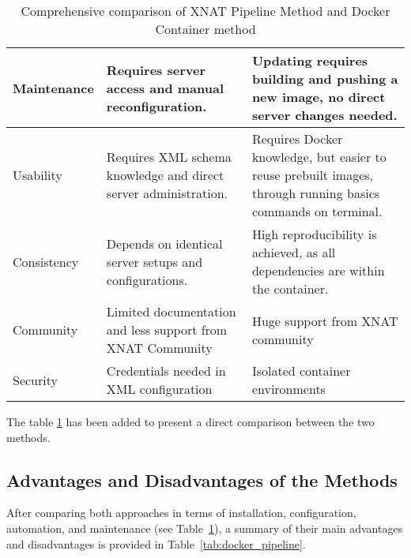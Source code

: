 \begin{table}[H]
\begin{tabular}{|>{\centering\arraybackslash}p{4cm}|
                    >{\centering\arraybackslash}p{5cm}|
                    >{\centering\arraybackslash}p{5cm}|}
Maintenance & Requires server access and manual reconfiguration.& Updating requires building and pushing a new image, no direct server changes needed.\\ \hline
Usability& Requires XML schema knowledge and direct server administration.& Requires Docker knowledge, but easier to reuse prebuilt images, through running basics commands on terminal.\\ \hline
Consistency& Depends on identical server setups and configurations.& High reproducibility is achieved, as all dependencies are within the container.\\ \hline
Community& Limited documentation and less support from XNAT Community& Huge support from XNAT community\\ \hline
Security& Credentials needed in XML configuration& Isolated container environments\\ \hline
    \end{tabular}
    \caption{Comprehensive comparison of XNAT Pipeline Method and Docker Container method}
    \label{tab:pipeline-vs-docker}
\end{table}







 The table \ref{tab:pipeline-vs-docker} has been added to present a direct comparison between the two methods.







 
 \subsection{Advantages and Disadvantages of the Methods}

After comparing both approaches in terms of installation, configuration, automation, and maintenance (see Table~\ref{tab:pipeline-vs-docker}), a summary of their main advantages and disadvantages is provided in Table~\ref{tab:docker_pipeline}.

